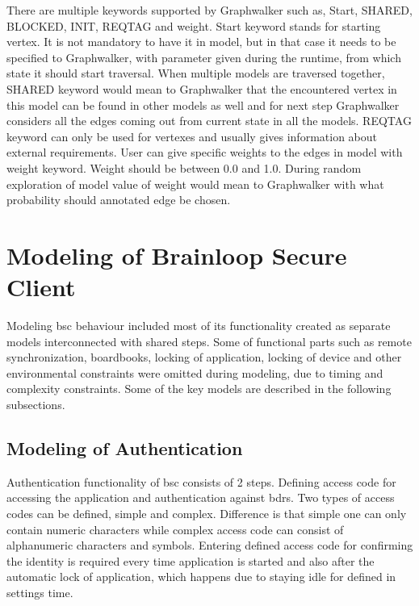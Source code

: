 \par
There are multiple keywords supported by Graphwalker such as, Start, SHARED, BLOCKED, INIT, REQTAG and weight. Start keyword stands for starting vertex. It is not mandatory to have it in model, but in that case it needs to be specified to Graphwalker, with parameter given during the runtime, from which state it should start traversal. When multiple models are traversed together, SHARED keyword would mean to Graphwalker that the encountered vertex in this model can be found in other models as well and for next step Graphwalker considers all the edges coming out from current state in all the models. REQTAG keyword can only be used for vertexes and usually gives information about external requirements. User can give specific weights to the edges in model with weight keyword. Weight should be between 0.0 and 1.0. During random exploration of model value of weight would mean to Graphwalker with what probability should annotated edge be chosen.

\section{Modeling of Brainloop Secure Client}

\par
Modeling \acrshort{bsc} behaviour included  most of its functionality created as separate models interconnected with shared steps. Some of functional parts such as remote synchronization, boardbooks, locking of application, locking of device and other environmental constraints were omitted during modeling, due to timing and complexity constraints. Some of the key models are described in the following subsections.

\subsection{Modeling of Authentication}
\par
Authentication functionality of \acrshort{bsc} consists of 2 steps. Defining access code for accessing the application and authentication against \acrshort{bdrs}. Two types of access codes can be defined, simple and complex. Difference is that simple one can only contain numeric characters while complex access code can consist of alphanumeric characters and symbols. Entering defined access code for confirming the identity is required every time application is started and also after the automatic lock of application, which happens due to staying idle for defined in settings time.

